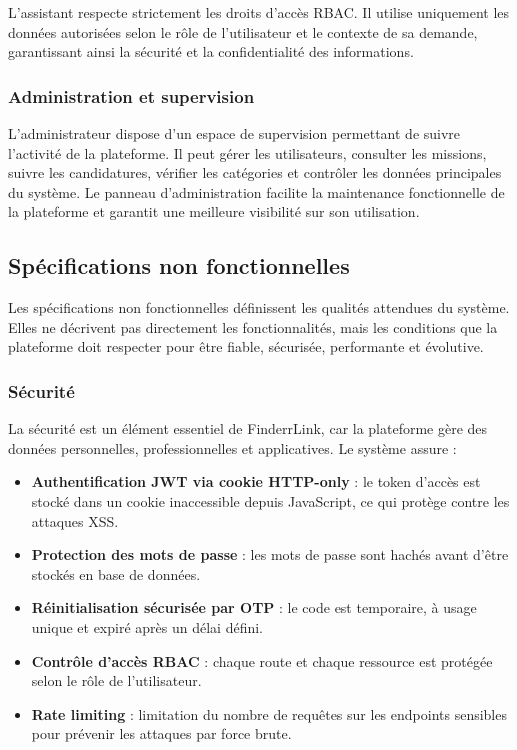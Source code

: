 L'assistant respecte strictement les droits d'accès RBAC. Il utilise uniquement les données autorisées selon le rôle de l'utilisateur et le contexte de sa demande, garantissant ainsi la sécurité et la confidentialité des informations.

\subsubsection{Administration et supervision}

L'administrateur dispose d'un espace de supervision permettant de suivre l'activité de la plateforme. Il peut gérer les utilisateurs, consulter les missions, suivre les candidatures, vérifier les catégories et contrôler les données principales du système. Le panneau d'administration facilite la maintenance fonctionnelle de la plateforme et garantit une meilleure visibilité sur son utilisation.

\subsection{Spécifications non fonctionnelles}

Les spécifications non fonctionnelles définissent les qualités attendues du système. Elles ne décrivent pas directement les fonctionnalités, mais les conditions que la plateforme doit respecter pour être fiable, sécurisée, performante et évolutive.

\subsubsection{Sécurité}

La sécurité est un élément essentiel de FinderrLink, car la plateforme gère des données personnelles, professionnelles et applicatives. Le système assure :

\begin{itemize}
    \item \textbf{Authentification JWT via cookie HTTP-only} : le token d'accès est stocké dans un cookie inaccessible depuis JavaScript, ce qui protège contre les attaques XSS.
    \item \textbf{Protection des mots de passe} : les mots de passe sont hachés avant d'être stockés en base de données.
    \item \textbf{Réinitialisation sécurisée par OTP} : le code est temporaire, à usage unique et expiré après un délai défini.
    \item \textbf{Contrôle d'accès RBAC} : chaque route et chaque ressource est protégée selon le rôle de l'utilisateur.
    \item \textbf{Rate limiting} : limitation du nombre de requêtes sur les endpoints sensibles pour prévenir les attaques par force brute.
\end{itemize}

